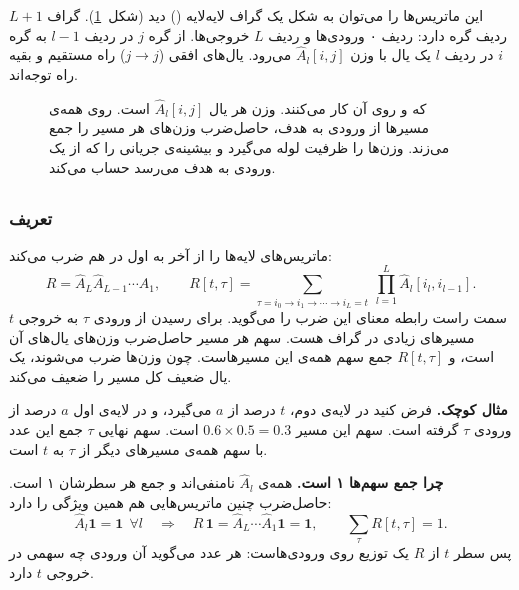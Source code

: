 این ماتریس‌ها را می‌توان به شکل یک گراف لایه‌لایه () دید (شکل~\ref{fig:layered}). گراف $L+1$ ردیف گره دارد: ردیف ۰ ورودی‌ها و ردیف $L$ خروجی‌ها. از گره $j$ در ردیف $l-1$ به گره $i$ در ردیف $l$ یک یال با وزن $\hat A_l[i,j]$ می‌رود. یال‌های افقی ($j\to j$) راه مستقیم  و بقیه راه توجه‌اند.

\begin{figure}[htbp]
\centering

\caption{ که  و  روی آن کار می‌کنند. وزن هر یال $\hat A_l[i,j]$ است.  روی همه‌ی مسیرها از ورودی به هدف، حاصل‌ضرب وزن‌های هر مسیر را جمع می‌زند.  وزن‌ها را ظرفیت لوله می‌گیرد و بیشینه‌ی جریانی را که از یک ورودی به هدف می‌رسد حساب می‌کند.}
\label{fig:layered}
\end{figure}

\subsection{}

\subsubsection*{تعریف}
 ماتریس‌های لایه‌ها را از آخر به اول در هم ضرب می‌کند:
\begin{equation}
R=\hat A_L\hat A_{L-1}\cdots\hat A_1,\qquad
R[t,\tau]=\sum_{\tau=i_0\to i_1\to\cdots\to i_L=t}\ \prod_{l=1}^{L}\hat A_l[i_l,i_{l-1}] .
\label{eq:rollout}
\end{equation}
سمت راست رابطه معنای این ضرب را می‌گوید. برای رسیدن از ورودی $\tau$ به خروجی $t$ مسیرهای زیادی در گراف هست. سهم هر مسیر حاصل‌ضرب وزن‌های یال‌های آن است، و $R[t,\tau]$ جمع سهم همه‌ی این مسیرهاست. چون وزن‌ها ضرب می‌شوند، یک یال ضعیف کل مسیر را ضعیف می‌کند.

\textbf{مثال کوچک.} فرض کنید در لایه‌ی دوم،  $t$  درصد از  $a$ می‌گیرد، و در لایه‌ی اول $a$  درصد از ورودی $\tau$ گرفته است. سهم این مسیر $0.6\times0.5=0.3$ است. سهم نهایی $\tau$ جمع این عدد با سهم همه‌ی مسیرهای دیگر از $\tau$ به $t$ است.

\textbf{چرا جمع سهم‌ها ۱ است.} همه‌ی $\hat A_l$ نامنفی‌اند و جمع هر سطرشان ۱ است. حاصل‌ضرب چنین ماتریس‌هایی هم همین ویژگی را دارد:
\begin{equation}
\hat A_l\mathbf 1=\mathbf 1\ \ \forall l\quad\Longrightarrow\quad R\,\mathbf 1=\hat A_L\cdots\hat A_1\mathbf 1=\mathbf 1,\qquad \sum_\tau R[t,\tau]=1 .
\end{equation}
پس سطر $t$ از $R$ یک توزیع روی ورودی‌هاست: هر عدد می‌گوید آن ورودی چه سهمی در خروجی  $t$ دارد.

